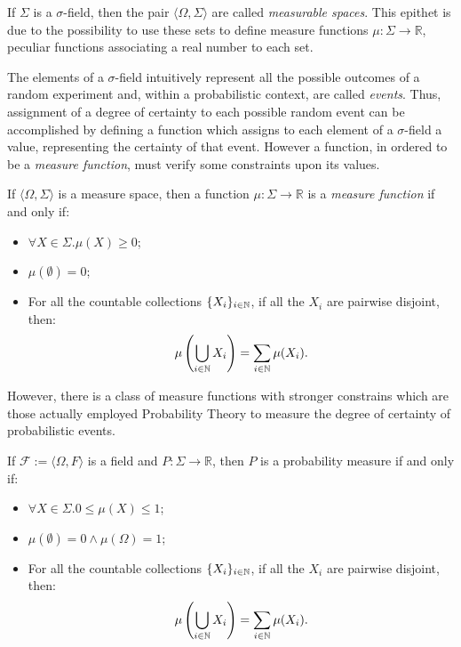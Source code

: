 \noindent
If $\Sigma$ is a $\sigma$-field, then the pair $\langle \Omega,
\Sigma\rangle$ are called \emph{measurable spaces}. This epithet is due to
the possibility to use these sets to define measure functions $\mu:
\Sigma \longrightarrow \mathbb R$, peculiar functions associating a
real number to each set.


The elements of a $\sigma$-field intuitively represent all the possible
outcomes of a random experiment and, within a probabilistic context,
are called \emph{events}. Thus, assignment of a degree of certainty to each possible random event can be accomplished by defining a function
which assigns to each element of a $\sigma$-field a value, representing
the certainty of that event.
%
However a function, in ordered to be a \emph{measure function},
must verify some constraints
upon its values.

\begin{defn}
  If $\langle \Omega, \Sigma\rangle$ is a measure space, then a function $\mu: \Sigma \longrightarrow \mathbb R$ is a \emph{measure function} if and only if:
  \begin{itemize}
    \item $\forall X \in \Sigma. \mu(X)\ge 0$;
    \item $\mu(\emptyset)=0$;
    \item For all the countable collections $\{X_i\}_{i \in \mathbb{N}}$, if all the $X_i$ are pairwise disjoint, then:
    $$
    \mu\left (\bigcup_{i \in \mathbb{N}} X_i \right)= \sum_{i \in \mathbb{N}}\mu(X_i).
    $$
  \end{itemize}
\end{defn}

However, there is a class of measure functions
with stronger constrains which are those actually employed Probability Theory
to measure the degree of certainty of probabilistic events.

\begin{defn}
  If $\mathcal F := \langle \Omega, F\rangle$ is a field and $P: \Sigma \longrightarrow \mathbb R$, then $P$ is a probability measure if and only if:
  \begin{itemize}
    \item $\forall X \in \Sigma. 0 \le  \mu(X)\le 1$;
    \item $\mu(\emptyset)=0 \land\mu(\Omega)=1$;
    \item For all the countable collections $\{X_i\}_{i \in \mathbb{N}}$, if all the $X_i$ are pairwise disjoint, then:
    $$
    \mu\left (\bigcup_{i \in \mathbb{N}} X_i \right)= \sum_{i \in \mathbb{N}}\mu(X_i).
    $$
  \end{itemize}
\end{defn}


